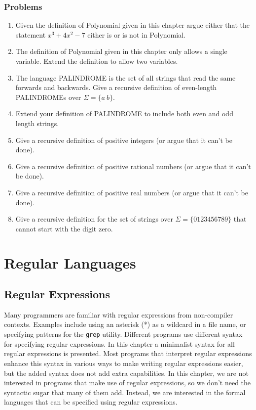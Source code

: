 \documentclass[letterpaper,12pt,openany,reqno]{book}%
\newcommand{\code}[1] {\lstinline[breaklines=yes,breakatwhitespace=yes]{#1}}
\begin{document}
\section{Problems}
\begin{enumerate}
\item Given the definition of Polynomial given in this chapter argue either that the statement $x^3 + 4x^2 -7$ either is or is not in Polynomial.
\item The definition of Polynomial given in this chapter only allows a single variable. Extend the definition to allow two variables.
\item The language PALINDROME is the set of all strings that read the same forwards and backwards. Give a recursive definition of even-length PALINDROMEs over $\Sigma = \{a\ b\}$. 
\item Extend your definition of PALINDROME to include both even and odd length strings.
\item Give a recursive definition of positive integers (or argue that it can't be done).
\item Give a recursive definition of positive rational numbers (or argue that it can't be done).
\item Give a recursive definition of positive real numbers (or argue that it can't be done).
\item Give a recursive definition for the set of strings over $\Sigma=\{0 1 2 3 4 5 6 7 8 9\}$ that cannot start with the digit zero.
\end{enumerate}

\part{Regular Languages}
\chapter{Regular Expressions}
Many programmers are familiar with regular expressions from non-compiler contexts. Examples include using an asterisk (*) as a wildcard in a file name, or specifying patterns for the \code{grep} utility. Different programs use different syntax for specifying regular expressions. In this chapter a minimalist syntax for all regular expressions is presented. Most programs that interpret regular expressions enhance this syntax in various ways to make writing regular expressions easier, but the added syntax does not add extra capabilities. In this chapter, we are not interested in programs that make use of regular expressions, so we don't need the syntactic sugar that many of them add. Instead, we are interested in the formal languages that can be specified using regular expressions.
\end{document}

